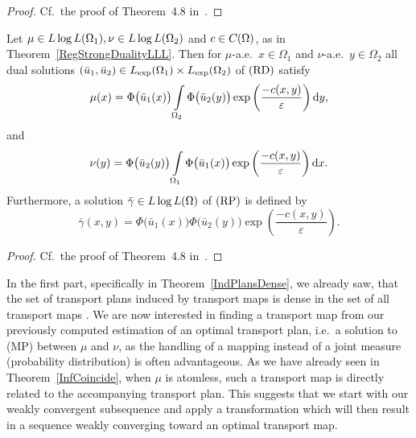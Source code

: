 \begin{proof}
	Cf.~the proof of Theorem~4.8 in~\cite{Cla2021}.
\end{proof}

\begin{corollary}\label{RegOptCond}
	Let $\mu \in \LLL[\Omega_1], \nu \in \LLL[\Omega_2]$ and $c \in \CF{\Omega}$, as in Theorem~\ref{RegStrongDualityLLL}. Then for $\mu$-a.e.\ $x \in \Omega_1$ and $\nu$-a.e.\ $y \in \Omega_2$ all dual solutions $(\bar{u}_1, \bar{u}_2) \in \Lexp[\Omega_1] \times \Lexp[\Omega_2]$ of$\text{\normalfont\ (RD)}$ satisfy
	\[ \mu(x) = \Phi\big( \bar{u}_1(x) \big) \int\limits_{\Omega_2} \Phi\big( \bar{u}_2(y) \big) \exp \left( \frac{- c(x, y)}{\varepsilon} \right)\D[y], \]
	and
	\[ \nu(y) = \Phi\big( \bar{u}_2(y) \big) \int\limits_{\Omega_1} \Phi\big( \bar{u}_1(x) \big) \exp \left( \frac{- c(x, y)}{\varepsilon} \right)\D[x]. \]
	Furthermore, a solution $\bar{\gamma} \in \LLL$ of$\text{\normalfont\ (RP)}$ is defined by
	\[ \bar{\gamma}(x, y) = \Phi\big( \bar{u}_1(x) \big) \Phi\big( \bar{u}_2(y) \big) \exp\left( \frac{- c(x, y)}{\varepsilon} \right). \]
\end{corollary}

\begin{proof}
	Cf.~the proof of Theorem~4.8 in~\cite{Cla2021}.
\end{proof}


In the first part, specifically in Theorem~\ref{IndPlansDense}, we already saw, that the set of transport plans induced by transport maps is dense in the set of all transport maps \TP{\mu}{\nu}. We are now interested in finding a transport map from our previously computed estimation of an optimal transport plan, i.e.~a solution to (MP) between $\mu$ and $\nu$, as the handling of a mapping instead of a joint measure (probability distribution) is often advantageous. As we have already seen in Theorem~\ref{InfCoincide}, when $\mu$ is atomless, such a transport map is directly related to the accompanying transport plan. This suggests that we start with our weakly convergent subsequence and apply a transformation which will then result in a sequence weakly converging toward an optimal transport map.


